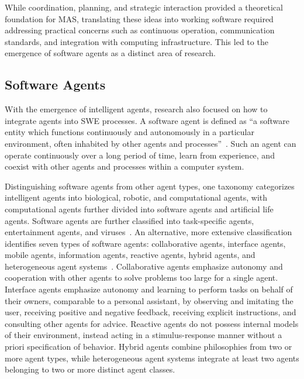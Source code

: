 \documentclass[
english,                 %
bibtex,                  %
]{kththesis}
\numberwithin{listing}{chapter}
\begin{document}
While coordination, planning, and strategic interaction provided a theoretical foundation for \gls{MAS}, translating these ideas into working software required addressing practical concerns such as continuous operation, communication standards, and integration with computing infrastructure. This led to the emergence of software agents as a distinct area of research.

\subsection{Software Agents}
\label{sec:bg_software_agents}
\glsresetall

With the emergence of intelligent agents, research also focused on how to integrate agents into \gls{SWE} processes. A software agent is defined as ``a software entity which functions continuously and autonomously in a particular environment, often inhabited by other agents and processes''~\cite{bradshaw_introduction_1997}. Such an agent can operate continuously over a long period of time, learn from experience, and coexist with other agents and processes within a computer system.

Distinguishing software agents from other agent types, one taxonomy categorizes intelligent agents into biological, robotic, and computational agents, with computational agents further divided into software agents and artificial life agents. Software agents are further classified into task-specific agents, entertainment agents, and viruses~\cite{franklin_is_1997}. An alternative, more extensive classification identifies seven types of software agents: collaborative agents, interface agents, mobile agents, information agents, reactive agents, hybrid agents, and heterogeneous agent systems~\cite{nwana_software_1996}. Collaborative agents emphasize autonomy and cooperation with other agents to solve problems too large for a single agent. Interface agents emphasize autonomy and learning to perform tasks on behalf of their owners, comparable to a personal assistant, by observing and imitating the user, receiving positive and negative feedback, receiving explicit instructions, and consulting other agents for advice. Reactive agents do not possess internal models of their environment, instead acting in a stimulus-response manner without a priori specification of behavior. Hybrid agents combine philosophies from two or more agent types, while heterogeneous agent systems integrate at least two agents belonging to two or more distinct agent classes.
\end{document}
